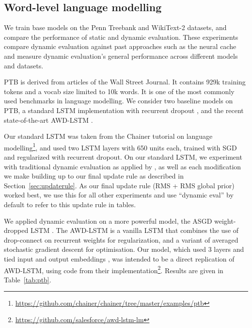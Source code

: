 \documentclass{article} %
\begin{document}
\subsection{Word-level language modelling}
\label{sec:ptb}
We train base models on the Penn Treebank \citep[PTB,][]{marcus1993} and WikiText-2 \citep{Merity2016} datasets, and compare the performance of static and dynamic evaluation. These experiments compare dynamic evaluation against past approaches such as the neural cache and measure dynamic evaluation's general performance across different models and datasets. 

PTB is derived from articles of the Wall Street Journal. It contains 929k training tokens and a vocab size limited to 10k words. It is one of the most commonly used benchmarks in language modelling. We consider two baseline models on PTB, a standard LSTM implementation with recurrent dropout \citep{Zaremba-2014}, and the recent state-of-the-art AWD-LSTM \citep{merity2017}. 

Our standard LSTM was taken from the Chainer tutorial on language modelling\footnote{\url{https://github.com/chainer/chainer/tree/master/examples/ptb}}, and used two LSTM layers with 650 units each, trained with SGD and regularized with recurrent dropout. On our standard LSTM, we experiment with traditional dynamic evaluation as applied by \citet{mikolov2010}, as well as each modification we make building up to our final update rule as described in Section~\ref{sec:updaterule}. As our final update rule (RMS + RMS global prior) worked best, we use this for all other experiments and use ``dynamic eval'' by default to refer to this update rule in tables. 

We applied dynamic evaluation on a more powerful model, the ASGD weight-dropped LSTM \citep[AWD-LSTM,][]{merity2017}. The AWD-LSTM is a vanilla LSTM that combines the use of drop-connect \citep{wan2013} on recurrent weights for regularization, and a variant of averaged stochastic gradient descent \citep{polyak1992} for optimisation. Our model, which used 3 layers and tied input and output embeddings \citep{press2017,inan2017}, was intended to be a direct replication of AWD-LSTM, using code from their implementation\footnote{\url{https://github.com/salesforce/awd-lstm-lm}}. Results are given in Table~\ref{tab:ptb}.
\end{document}

